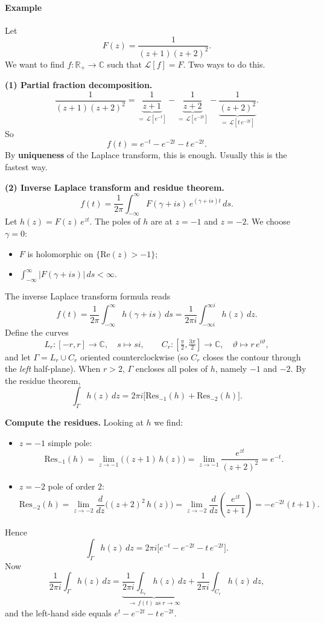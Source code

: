 \paragraph{Example}
\begin{example}
Let
\[
F(z) = \frac{1}{(z+1)(z+2)^2}.
\]
We want to find $f : \mathbb{R}_+ \to \mathbb{C}$ such that $\mathcal{L}[f] = F$. Two ways to do this.

\medskip

\textbf{(1) Partial fraction decomposition.}
\[
\frac{1}{(z+1)(z+2)^2}
= \underbrace{\frac{1}{z+1}}_{=\,\mathcal{L}[e^{-t}]}
- \underbrace{\frac{1}{z+2}}_{=\,\mathcal{L}[e^{-2t}]}
- \underbrace{\frac{1}{(z+2)^2}}_{=\,\mathcal{L}[t\,e^{-2t}]}.
\]
So
\[
f(t) = e^{-t} - e^{-2t} - t\,e^{-2t}.
\]
By \textbf{uniqueness} of the Laplace transform, this is enough. Usually this is the fastest way.

\medskip

\textbf{(2) Inverse Laplace transform and residue theorem.}
\[
f(t) = \frac{1}{2\pi}\int_{-\infty}^{\infty} F(\gamma + is)\,e^{(\gamma + is)t}\,ds.
\]
Let $h(z) = F(z)\,e^{zt}$. The poles of $h$ are at $z = -1$ and $z = -2$. We choose $\gamma = 0$:
\begin{itemize}
\item $F$ is holomorphic on $\{\mathrm{Re}(z) > -1\}$;
\item $\int_{-\infty}^{\infty} |F(\gamma + is)|\,ds < \infty$.
\end{itemize}
The inverse Laplace transform formula reads
\[
f(t) = \frac{1}{2\pi}\int_{-\infty}^{\infty} h(\gamma + is)\,ds = \frac{1}{2\pi i}\int_{-\infty i}^{\infty i} h(z)\,dz.
\]
Define the curves
\[
L_r : [-r, r] \to \mathbb{C}, \quad s \mapsto si,
\qquad
C_r : \left[\tfrac{\pi}{2}, \tfrac{3\pi}{2}\right] \to \mathbb{C}, \quad \vartheta \mapsto r\,e^{i\vartheta},
\]
and let $\Gamma = L_r \cup C_r$ oriented counterclockwise (so $C_r$ closes the contour through the \emph{left} half-plane). When $r > 2$, $\Gamma$ encloses all poles of $h$, namely $-1$ and $-2$. By the residue theorem,
\[
\int_{\Gamma} h(z)\,dz = 2\pi i \bigl[\mathrm{Res}_{-1}(h) + \mathrm{Res}_{-2}(h)\bigr].
\]

\textbf{Compute the residues.} Looking at $h$ we find:
\begin{itemize}
\item $z = -1$ simple pole:
\[
\mathrm{Res}_{-1}(h) = \lim_{z \to -1}\bigl((z+1)\,h(z)\bigr)
= \lim_{z \to -1}\frac{e^{zt}}{(z+2)^2} = e^{-t}.
\]
\item $z = -2$ pole of order $2$:
\[
\mathrm{Res}_{-2}(h) = \lim_{z \to -2}\frac{d}{dz}\bigl((z+2)^2\,h(z)\bigr)
= \lim_{z \to -2}\frac{d}{dz}\left(\frac{e^{zt}}{z+1}\right)
= -e^{-2t}(t + 1).
\]
\end{itemize}
Hence
\[
\int_{\Gamma} h(z)\,dz = 2\pi i\bigl[e^{-t} - e^{-2t} - t\,e^{-2t}\bigr].
\]
Now
\[
\frac{1}{2\pi i}\int_{\Gamma} h(z)\,dz
= \underbrace{\frac{1}{2\pi i}\int_{L_r} h(z)\,dz}_{\to\,f(t) \text{ as } r \to \infty}
+ \frac{1}{2\pi i}\int_{C_r} h(z)\,dz,
\]
and the left-hand side equals $e^{t} - e^{-2t} - t\,e^{-2t}$.


\end{example}
